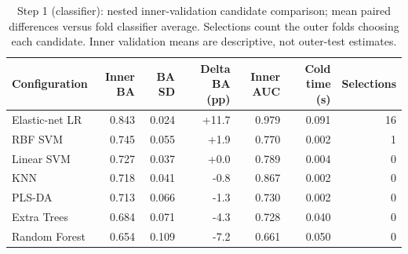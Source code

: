 \begin{table}[t]
\centering
\caption{Step 1 (classifier): nested inner-validation candidate comparison; mean paired differences versus fold classifier average. Selections count the outer folds choosing each candidate. Inner validation means are descriptive, not outer-test estimates.}
\label{tab:step1_candidates}
\footnotesize
\setlength{\tabcolsep}{4pt}
\begin{tabular}{lrrrrrr}
\toprule
Configuration & Inner BA & BA SD & Delta BA (pp) & Inner AUC & Cold time (s) & Selections \\
\midrule
Elastic-net LR & 0.843 & 0.024 & +11.7 & 0.979 & 0.091 & 16 \\
RBF SVM & 0.745 & 0.055 & +1.9 & 0.770 & 0.002 & 1 \\
Linear SVM & 0.727 & 0.037 & +0.0 & 0.789 & 0.004 & 0 \\
KNN & 0.718 & 0.041 & -0.8 & 0.867 & 0.002 & 0 \\
PLS-DA & 0.713 & 0.066 & -1.3 & 0.730 & 0.002 & 0 \\
Extra Trees & 0.684 & 0.071 & -4.3 & 0.728 & 0.040 & 0 \\
Random Forest & 0.654 & 0.109 & -7.2 & 0.661 & 0.050 & 0 \\
\bottomrule
\end{tabular}
\end{table}
